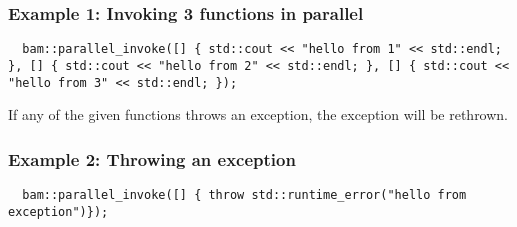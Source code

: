 \documentclass[11pt, a4paper]{article}
\begin{document}
\subsubsection{Example 1: Invoking 3 functions in parallel}

\begin{lstlisting}
  bam::parallel_invoke([] { std::cout << "hello from 1" << std::endl; }, [] { std::cout << "hello from 2" << std::endl; }, [] { std::cout << "hello from 3" << std::endl; });
\end{lstlisting}

If any of the given functions throws an exception, the exception will be rethrown.

\subsubsection{Example 2: Throwing an exception}

\begin{lstlisting}
  bam::parallel_invoke([] { throw std::runtime_error("hello from exception")});
\end{lstlisting}
\end{document}

